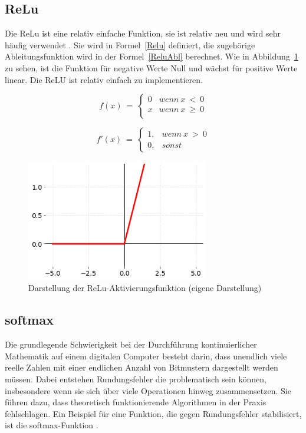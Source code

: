 \subsection{ReLu}
Die ReLu ist eine relativ einfache Funktion, sie ist relativ neu und wird sehr häufig verwendet \cite*[11]{AntonioGuili;AmitaKapoor;SujitPal2019}. Sie wird in Formel~\ref{Relu} definiert, die zugehörige Ableitungsfunktion wird in der Formel~\ref{ReluAbl} berechnet. Wie in Abbildung~\ref{Kap2:ReLu_plot} zu sehen, ist die Funktion für negative Werte Null und wächst für positive Werte linear. Die ReLU ist relativ einfach zu implementieren.

\begin{equation} \label{Relu}
    f( x) \ =\ \begin{cases}
        0 & wenn\ x\  <\ 0    \\
        x & wenn\ x\  \geq\ 0 \\
    \end{cases}
\end{equation}

\begin{equation} \label{ReluAbl}
    f'( x) \ =\ \begin{cases}
        1, & wenn\ x\  >\ 0 \\
        0, & sonst
    \end{cases}
\end{equation}

\begin{figure}[H]
    \centering
    \includegraphics[width=8cm]{kapitel2/relu_plot.png}
    \caption[Darstellung der ReLu-Aktivierungsfunktion]{Darstellung der ReLu-Aktivierungsfunktion (eigene Darstellung)}
    \label{Kap2:ReLu_plot}
\end{figure}

\subsection{softmax}
Die grundlegende Schwierigkeit bei der Durchführung kontinuierlicher Mathematik auf einem digitalen Computer besteht darin, dass unendlich viele reelle Zahlen mit einer endlichen Anzahl von Bitmustern dargestellt werden müssen. Dabei entstehen Rundungsfehler die problematisch sein können, insbesondere wenn sie sich über viele Operationen hinweg zusammensetzen. Sie führen dazu, dass theoretisch funktionierende Algorithmen in der Praxis fehlschlagen. Ein Beispiel für eine Funktion, die gegen Rundungsfehler stabilisiert, ist die softmax-Funktion \cite*[80-81]{IanGoodfellowYoshuaBengio2016}.

